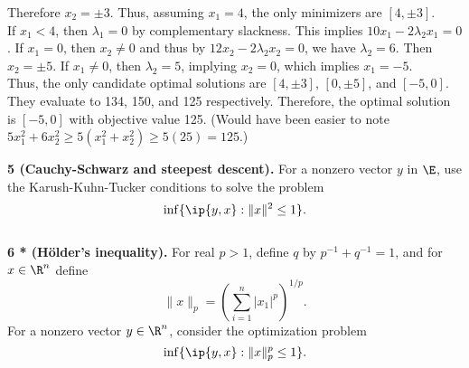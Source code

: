 \documentclass[../borwein-lewis_notes.tex]{subfiles}
\begin{document}
\begin{enumerate}[(a)]
{Therefore $x_2 = \pm 3$. Thus, assuming $x_1=4$, the
 only minimizers are $[4, \pm 3]$.\\
 If $x_1 < 4$, then $\lambda_1=0$ by complementary slackness.
This implies $10x_1 - 2\lambda_2x_1 = 0$. If $x_1=0$, then $x_2\neq 0$ 
and thus by $12x_2-2\lambda_2x_2=0$, we have $\lambda_2=6$. Then 
$x_2=\pm 5$. If $x_1\neq 0$, then $\lambda_2 = 5$, implying 
$x_2 =0$, which implies $x_1=-5$. \\
Thus, the only candidate optimal solutions are $[4, \pm 3]$, 
$[0, \pm 5]$, and $[-5, 0]$. They evaluate to 134, 
150, and 125 respectively. Therefore, the optimal solution is 
$[-5,0]$ with objective value 125. (Would have been easier 
to note $5x_1^2 + 6x_2^2 \geq 5(x_1^2+x_2^2) \geq 5(25)=125$.)
}
\end{enumerate}
\textbf{5 (Cauchy-Schwarz and steepest descent).} For a nonzero vector $y$ 
in $\E$, use the Karush-Kuhn-Tucker conditions to solve the problem 
\begin{equation*}
\inf\{\ip{y,x} : \|x\|^2\leq1\}.
\end{equation*}
\\
\textbf{6 * (H\"{o}lder's inequality).} For real $p>1$, define $q$ by 
$p^{-1} + q^{-1} =1$, and for $x\in\R^n$ define 
\begin{equation*}
\|x\|_p = \left(\sum_{i=1}^n |x_1|^p\right)^{1/p}.
\end{equation*}
For a nonzero vector $y\in\R^n$, consider the optimization problem 
\begin{equation}
\inf\{\ip{y,x} : \|x\|_p^p\leq 1\}.
\label{2.3.9}
\end{equation}
\end{document}
